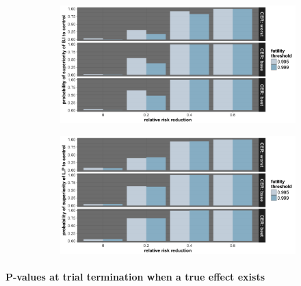 \documentclass[]{article}
\let\oldparagraph\paragraph
\renewcommand{\paragraph}[1]{\oldparagraph{#1}\mbox{}}
\begin{document}
\begin{figure}
\centering
  \caption{Probability of stopping (a) B.I. or (b) L.P. for superiority.  Stopping probabilities are presented for the
  three control event rates (CER – rows), four relative risk reductions (RRR – columns), and two superiority thresholds for B.I. (legend). Note that the legend and x axis labels should reflect the description given above, not as labeled on the graphic.}
  \begin{subfigure}{0.8\textwidth}
    \centering
    \caption{}
    \includegraphics{../plots/3arm/supbi_3arm.png}
  \end{subfigure}
  \bigbreak
  \begin{subfigure}{0.8\textwidth}
    \centering
    \caption{}
    \includegraphics{../plots/3arm/suplp_3arm.png}
  \end{subfigure}
\end{figure}

\hypertarget{p-values-at-trial-termination-when-a-true-effect-exists-1}{%
\paragraph{P-values at trial termination when a true effect
exists}\label{p-values-at-trial-termination-when-a-true-effect-exists-1}}
\end{document}

